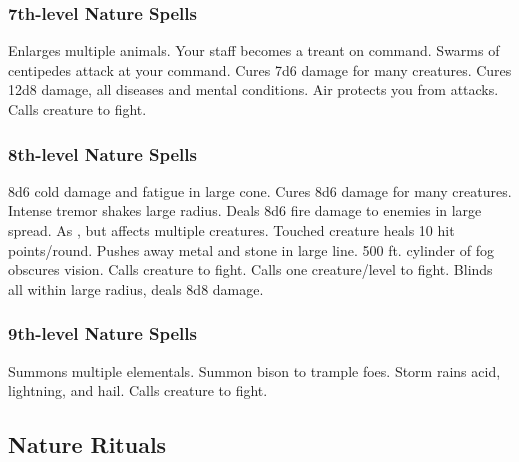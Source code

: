 \subsubsection{7th-level Nature Spells}
\begin{spelllist}
   Enlarges multiple animals.
   Your staff becomes a treant on command.
   Swarms of centipedes attack at your command.
   Cures 7d6 damage for many creatures.
   Cures 12d8 damage, all diseases and mental conditions.
   Air protects you from attacks. 
   Calls creature to fight.
\end{spelllist}

\subsubsection{8th-level Nature Spells}
\begin{spelllist}
   8d6 cold damage and fatigue in large cone.
   Cures 8d6 damage for many creatures.
   Intense tremor shakes large radius.
   Deals 8d6 fire damage to enemies in large spread.
   As , but affects multiple creatures.
   Touched creature heals 10 hit points/round.
   Pushes away metal and stone in large line.
   500 ft. cylinder of fog obscures vision.
   Calls creature to fight.
   Calls one creature/level to fight.
   Blinds all within large radius, deals 8d8 damage.
\end{spelllist}

\subsubsection{9th-level Nature Spells}
\begin{spelllist}
   Summons multiple elementals.
   Summon bison to trample foes.
   Storm rains acid, lightning, and hail.
   Calls creature to fight.
\end{spelllist}

\subsection{Nature Rituals}

